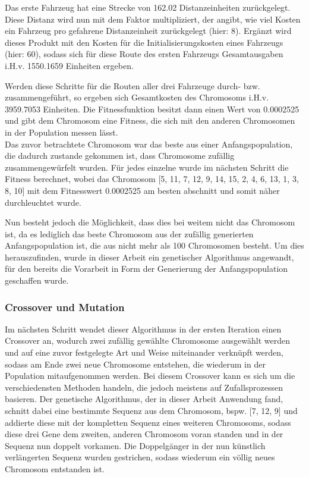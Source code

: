 \documentclass[a4paper,12pt,parskip,bibtotoc,liststotoc]{article}
\begin{document}
Das erste Fahrzeug hat eine Strecke von 162.02 Distanzeinheiten zurückgelegt.
Diese Distanz wird nun mit dem Faktor multipliziert, der angibt, wie viel Kosten ein Fahrzeug pro gefahrene Distanzeinheit zurückgelegt (hier: 8).
Ergänzt wird dieses Produkt mit den Kosten für die Initialisierungskosten eines Fahrzeugs (hier: 60), sodass sich für diese Route des ersten Fahrzeugs Gesamtausgaben i.H.v. 1550.1659 Einheiten ergeben.

Werden diese Schritte für die Routen aller drei Fahrzeuge durch- bzw. zusammengeführt, so ergeben sich Gesamtkosten des Chromosoms i.H.v. 3959.7053 Einheiten.
Die Fitnessfunktion besitzt dann einen Wert von 0.0002525 und gibt dem Chromosom eine Fitness, die sich mit den anderen Chromosomen in der Population messen lässt.\\

Das zuvor betrachtete Chromosom war das beste aus einer Anfangspopulation, die dadurch zustande gekommen ist, dass Chromosome zufällig zusammengewürfelt wurden.
Für jedes einzelne wurde im nächsten Schritt die Fitness berechnet, wobei das Chromosom [5, 11, 7, 12, 9, 14, 15, 2, 4, 6, 13, 1, 3, 8, 10] mit dem Fitnesswert 0.0002525 am besten abschnitt und somit näher durchleuchtet wurde.

Nun besteht jedoch die Möglichkeit, dass dies bei weitem nicht das Chromosom ist, da es lediglich das beste Chromosom aus der zufällig generierten Anfangspopulation ist, die aus nicht mehr als 100 Chromosomen besteht.
Um dies herauszufinden, wurde in dieser Arbeit ein genetischer Algorithmus angewandt, für den bereits die Vorarbeit in Form der Generierung der Anfangspopulation geschaffen wurde.

\subsubsection{Crossover und Mutation}

Im nächsten Schritt wendet dieser Algorithmus in der ersten Iteration einen Crossover an, wodurch zwei zufällig gewählte Chromosome ausgewählt werden und auf eine zuvor festgelegte Art und Weise miteinander verknüpft werden, sodass am Ende zwei neue Chromosome entstehen, die wiederum in der Population mitaufgenommen werden.
Bei diesem Crossover kann es sich um die verschiedensten Methoden handeln, die jedoch meistens auf Zufallsprozessen basieren.
Der genetische Algorithmus, der in dieser Arbeit Anwendung fand, schnitt dabei eine bestimmte Sequenz aus dem Chromosom, bspw. [7, 12, 9] und addierte diese mit der kompletten Sequenz eines weiteren Chromosoms, sodass diese drei Gene dem zweiten, anderen Chromosom voran standen und in der Sequenz nun doppelt vorkamen. 
Die Doppelgänger in der nun künstlich verlängerten Sequenz wurden gestrichen, sodass wiederum ein völlig neues Chromosom entstanden ist.
\end{document}
